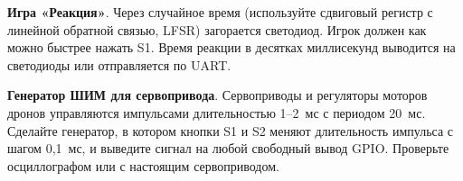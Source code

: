 \begin{taskbox}
\textbf{Игра «Реакция»}. Через случайное время (используйте
сдвиговый регистр с линейной обратной связью, LFSR) загорается светодиод.
Игрок должен как можно быстрее нажать S1. Время реакции в десятках миллисекунд
выводится на светодиоды или отправляется по UART.
\end{taskbox}

\begin{taskbox}
\textbf{Генератор ШИМ для сервопривода}. Сервоприводы и регуляторы моторов
дронов управляются импульсами длительностью 1--2~мс с периодом 20~мс.
Сделайте генератор, в котором кнопки S1 и S2 меняют длительность импульса с
шагом 0,1~мс, и выведите сигнал на любой свободный вывод GPIO. Проверьте
осциллографом или с настоящим сервоприводом.
\end{taskbox}

